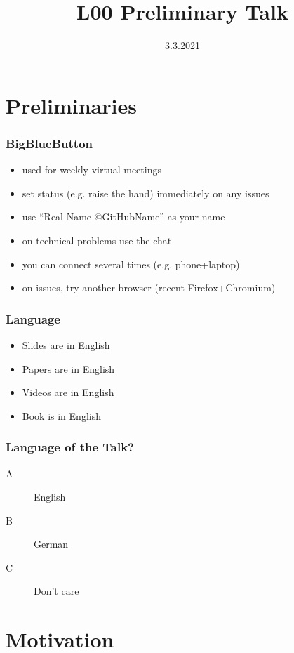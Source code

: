 

\title{L00 Preliminary Talk}
\date{3.3.2021}



\renewcommand{\enquote}[1]{\emph{``#1''}} %

\section{Preliminaries}

\begin{frame}
	\frametitle{BigBlueButton}
	\begin{itemize}
		\item used for weekly virtual meetings
		\item set status (e.g. raise the hand) immediately on any issues
		\item use ``Real Name @GitHubName'' as your name
		\item on technical problems use the chat
		\item you can connect several times (e.g. phone+laptop)
		\item on issues, try another browser (recent Firefox+Chromium)
	\end{itemize}
\end{frame}

\begin{frame}
	\frametitle{Language}
	\begin{itemize}
		\item Slides are in English
		\item Papers are in English
		\item Videos are in English
		\item Book is in English
	\end{itemize}
\end{frame}

\begin{assignment}
	\frametitle{Language of the Talk?}
	\begin{task}
	\begin{description}
	\item[A] English
	\item[B] German
	\item[C] Don't care
	\end{description}
	\end{task}
\end{assignment}

\section{Motivation}
